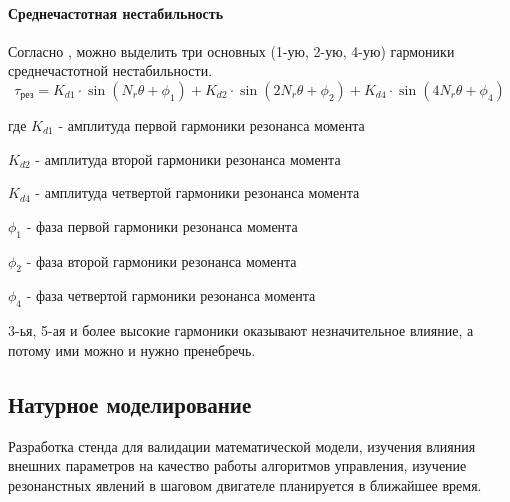 \paragraph{Среднечастотная нестабильность}
Согласно \cite[ф-ла 5]{Novel_Modeling_and_Damping}, можно выделить три основных (1-ую, 2-ую, 4-ую)
гармоники среднечастотной нестабильности.
\begin{equation}
    \tau_{\text{рез}} =   K_{d1} \cdot \sin{ (  N_{r} \theta + \phi_{1}) }
                         + K_{d2} \cdot \sin{ (2 N_{r} \theta + \phi_{2}) }
                         + K_{d4} \cdot \sin{ (4 N_{r} \theta + \phi_{4}) }
\end{equation}

где $K_{d1}$ - амплитуда первой гармоники резонанса момента

$K_{d2}$ - амплитуда второй гармоники резонанса момента

$K_{d4}$ - амплитуда четвертой гармоники резонанса момента

$\phi_{1}$ - фаза первой гармоники резонанса момента

$\phi_{2}$ - фаза второй гармоники резонанса момента

$\phi_{4}$ - фаза четвертой гармоники резонанса момента

3-ья, 5-ая и более высокие гармоники оказывают незначительное влияние, а потому
ими можно и нужно пренебречь.

\newpage
\subsection{Натурное моделирование}
Разработка стенда для валидации математической модели, изучения влияния внешних параметров
на качество работы алгоритмов управления, изучение резонанстных явлений в шаговом
двигателе планируется в ближайшее время.

